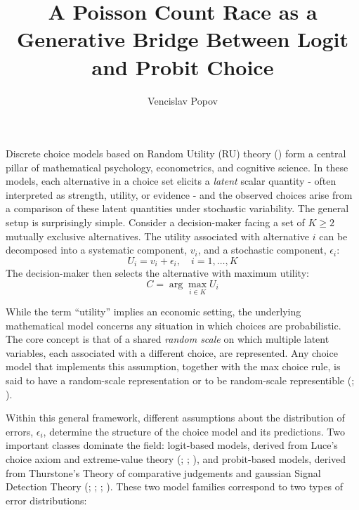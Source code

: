 \documentclass[
  man,
  floatsintext,
  longtable,
  a4paper,
  nolmodern,
  notxfonts,
  notimes,
  colorlinks=true,linkcolor=blue,citecolor=blue,urlcolor=blue]{apa7}
\title{A Poisson Count Race as a Generative Bridge Between Logit and
Probit Choice}
\author{Vencislav Popov}
\affiliation{
{Department of Psychology, University of Zurich}}
\begin{document}
\maketitle



\setcounter{secnumdepth}{3}

\setlength\LTleft{0pt}




Discrete choice models based on Random Utility (RU) theory
()
form a central pillar of mathematical psychology, econometrics, and
cognitive science. In these models, each alternative in a choice set
elicits a \emph{latent} scalar quantity - often interpreted as strength,
utility, or evidence - and the observed choices arise from a comparison
of these latent quantities under stochastic variability. The general
setup is surprisingly simple. Consider a decision-maker facing a set of
\(K \ge 2\) mutually exclusive alternatives. The utility associated with
alternative \(i\) can be decomposed into a systematic component,
\(v_i\), and a stochastic component, \(\epsilon_i\): \[
U_{i} = v_{i} + \epsilon_{i}, \quad i=1, \dots, K
\] The decision-maker then selects the alternative with maximum utility:
\[
C = \arg \max_{i \in K} U_{i}
\]

While the term ``utility'' implies an economic setting, the underlying
mathematical model concerns any situation in which choices are
probabilistic. The core concept is that of a shared \emph{random scale}
on which multiple latent variables, each associated with a different
choice, are represented. Any choice model that implements this
assumption, together with the max choice rule, is said to have a
random-scale representation or to be random-scale representible
(; ).

Within this general framework, different assumptions about the
distribution of errors, \(\epsilon_i\), determine the structure of the
choice model and its predictions. Two important classes dominate the
field: logit-based models, derived from Luce's choice axiom and
extreme-value theory
(;
;
), and
probit-based models, derived from Thurstone's Theory of comparative
judgements and gaussian Signal Detection Theory
(; ;
;
). These
two model families correspond to two types of error distributions:
\end{document}
